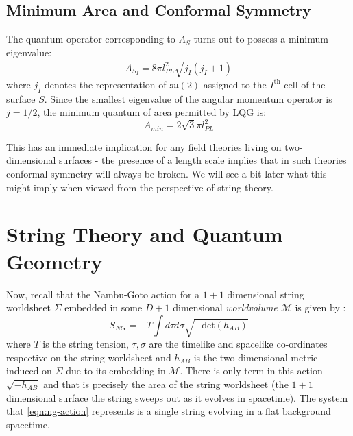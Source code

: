 \documentclass[11pt,a4paper,nofootinbib]{revtex4-1}
\newcommand{\mc}[1]{\mathcal{#1}}
\newcommand{\mf}[1]{\mathfrak{#1}}
\begin{document}
\subsection{Minimum Area and Conformal Symmetry}\label{sec:conformal}

The quantum operator corresponding to $ A_S $ turns out to possess a minimum eigenvalue:
\begin{equation}\label{eqn:area-eigenvalue}
	A_{S_I} = 8\pi l^2_{PL} \sqrt{j_I (j_I + 1)}
\end{equation}
where $ j_I $ denotes the representation of $ \mf{su}(2) $ assigned to the $ I^{\text{th}} $ cell of the surface $ S $. Since the smallest eigenvalue of the angular momentum operator is $ j = 1/2 $, the minimum quantum of area permitted by LQG is:
\begin{equation}\label{eqn:area-minimum}
	A_{min} = 2 \sqrt{3} \pi l^2_{PL} 
\end{equation}

This has an immediate implication for any field theories living on two-dimensional surfaces - the presence of a length scale implies that in such theories conformal symmetry will always be broken. We will see a bit later what this might imply when viewed from the perspective of string theory.

\section{String Theory and Quantum Geometry}\label{sec:string-geometry}

Now, recall that the Nambu-Goto action for a $ 1+1 $ dimensional string worldsheet $ \Sigma $ embedded in some $ D+1 $ dimensional \emph{worldvolume} $ \mc{M} $ is given by \cite{t-Hooft2004Introduction,Tong2010Lectures,Zwiebach2009A-First}:
\begin{equation}\label{eqn:ng-action}
	S_{NG} = -T \int d\tau d\sigma \sqrt{-\text{det} (h_{AB})}
\end{equation}
where $ T $ is the string tension, $ \tau, \sigma $ are the timelike and spacelike co-ordinates respective on the string worldsheet and $ h_{AB} $ is the two-dimensional metric induced on $ \Sigma $ due to its embedding in $ \mc{M} $. There is only term in this action $ \sqrt{-h_{AB}} $ and that is precisely the area of the string worldsheet (the $ 1+1 $ dimensional surface the string sweeps out as it evolves in spacetime). The system that \eqref{eqn:ng-action} represents is a single string evolving in a flat background spacetime.
\end{document}
